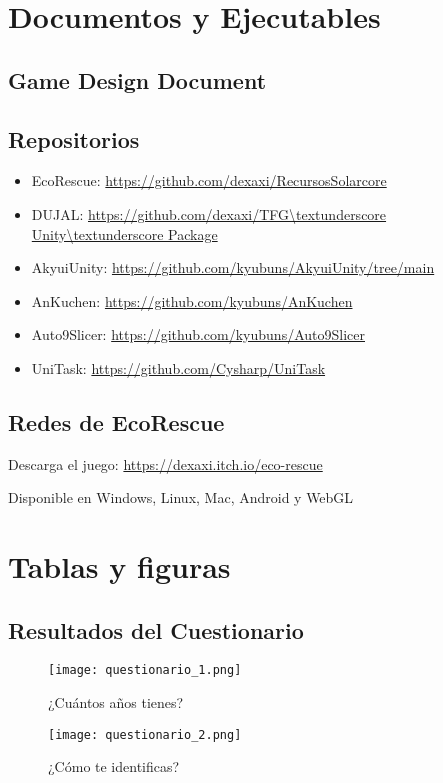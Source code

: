 \section{Documentos y Ejecutables}
\subsection{Game Design Document}

\subsection{Repositorios}
\begin{itemize}
  \item EcoRescue: \url{https://github.com/dexaxi/RecursosSolarcore}
  \item DUJAL: \url{https://github.com/dexaxi/TFG\textunderscore Unity\textunderscore Package}
  \item AkyuiUnity: \url{https://github.com/kyubuns/AkyuiUnity/tree/main} 
  \item AnKuchen: \url{https://github.com/kyubuns/AnKuchen}
  \item Auto9Slicer: \url{https://github.com/kyubuns/Auto9Slicer}
  \item UniTask: \url{https://github.com/Cysharp/UniTask}
\end{itemize}

\subsection{Redes de EcoRescue}
Descarga el juego: \url{https://dexaxi.itch.io/eco-rescue}

Disponible en Windows, Linux, Mac, Android y WebGL

\section{Tablas y figuras}

\subsection{Resultados del Cuestionario}
\begin{figure}[H]
  \centering
  \texttt{[image: questionario\_1.png]}
  \caption{¿Cuántos años tienes?}
  \label{fig:questionario_1}
\end{figure}
\raggedbottom

\begin{figure}[H]
  \centering
  \texttt{[image: questionario\_2.png]}
  \caption{¿Cómo te identificas?}
  \label{fig:questionario_2}
\end{figure}
\raggedbottom

